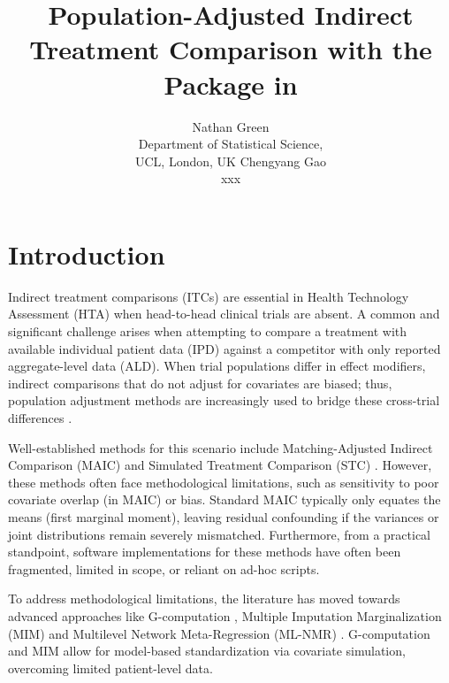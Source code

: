 \documentclass[article]{jss}
\author{Nathan Green \\Department of Statistical Science,\\ UCL, London, UK
\And Chengyang Gao \\xxx}
\title{Population-Adjusted Indirect Treatment Comparison with the \pkg{outstandR} Package in \proglang{R}}
\begin{document}
\section{Introduction}
\label{sec:introduction}

Indirect treatment comparisons (ITCs) are essential in Health Technology Assessment (HTA) when head-to-head clinical trials are absent. A common and significant challenge arises when attempting to compare a treatment with available individual patient data (IPD) against a competitor with only reported aggregate-level data (ALD). When trial populations differ in effect modifiers, indirect comparisons that do not adjust for covariates are biased; thus, population adjustment methods are increasingly used to bridge these cross-trial differences \citep{Phillippo2016DSU}.


Well-established methods for this scenario include Matching-Adjusted Indirect Comparison (MAIC)  \citep{signorovitch2010} and Simulated Treatment Comparison (STC) \citep{caro2010,ishak2015}. However, these methods often face methodological limitations, such as sensitivity to poor covariate overlap (in MAIC) or bias. Standard MAIC typically only equates the means (first marginal moment), leaving residual confounding if the variances or joint distributions remain severely mismatched. Furthermore, from a practical standpoint, software implementations for these methods have often been fragmented, limited in scope, or reliant on ad-hoc scripts.


To address methodological limitations, the literature has moved towards advanced approaches like G-computation \citep{RemiroAzocar2022a}, Multiple Imputation Marginalization (MIM) \citep{RemiroAzocar2022b} and Multilevel Network Meta-Regression (ML-NMR) \citep{phillippo_multinma_2020}. G-computation and MIM allow for model-based standardization via covariate simulation, overcoming limited patient-level data.

%
\end{document}
